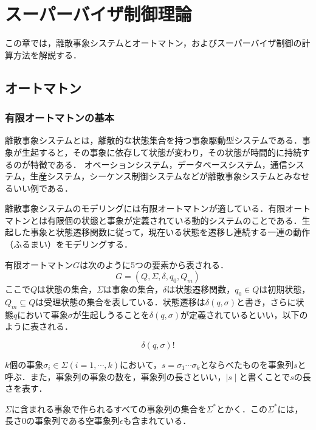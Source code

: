 \chapter{スーパーバイザ制御理論}
この章では，離散事象システムとオートマトン，およびスーパーバイザ制御の計算方法を解説する．

\section{オートマトン}

\subsection{有限オートマトンの基本}

離散事象システムとは，離散的な状態集合を持つ事象駆動型システムである\cite{DES}．事象が生起すると，その事象に依存して状態が変わり，その状態が時間的に持続するのが特徴である．
オペーションシステム，データベースシステム，通信システム，生産システム，シーケンス制御システムなどが離散事象システムとみなせるいい例である\cite{des_example}．

離散事象システムのモデリングには有限オートマトンが適している．有限オートマトンとは有限個の状態と事象が定義されている動的システムのことである．生起した事象と状態遷移関数に従って，現在いる状態を遷移し連続する一連の動作（ふるまい）をモデリングする．

有限オートマトン$G$は次のように5つの要素から表される．
\begin{equation}
    G = (Q, \Sigma, \delta, q_{0}, Q_{m})
\end{equation}
ここで$Q$は状態の集合，$\Sigma$は事象の集合，$\delta$は状態遷移関数，$q_0\in Q$は初期状態，$Q_m\subseteq Q$は受理状態の集合を表している．状態遷移は$\delta(q,\sigma)$と書き，さらに状態$q$において事象$\sigma$が生起しうることを$\delta(q,\sigma)$が定義されているといい，以下のように表される．

$$\delta(q,\sigma)!$$

$k$個の事象$\sigma_i\in\Sigma(i=1,\cdots,k)$において，$s=\sigma_1 \cdots \sigma_k$とならべたものを事象列$s$と呼ぶ．また，事象列の事象の数を，事象列の長さといい，$\mid s\mid$と書くことで$s$の長さを表す．

$\Sigma$に含まれる事象で作られるすべての事象列の集合を$\Sigma^\ast$とかく．この$\Sigma^\ast$には，長さ0の事象列である空事象列$\epsilon$も含まれている．


